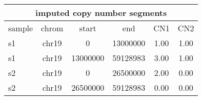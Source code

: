 \documentclass{standalone}
\begin{document}
\begin{tabular}{|l|c|c|c|c|c|}
\hline
\multicolumn{6}{|c|}{\textbf{imputed copy number segments}}\\
\hline 

sample & chrom & start & end & CN1 & CN2 \\
\hline
s1 & chr19 & 0 & 13000000 & 1.00 & 1.00 \\
s1 & chr19 & 13000000 & 59128983 & 3.00 & 1.00 \\
s2 & chr19 & 0 & 26500000 & 2.00 & 0.00 \\
s2 & chr19 & 26500000 & 59128983 & 0.00 & 0.00 \\
\hline
\end{tabular}
\end{document}
